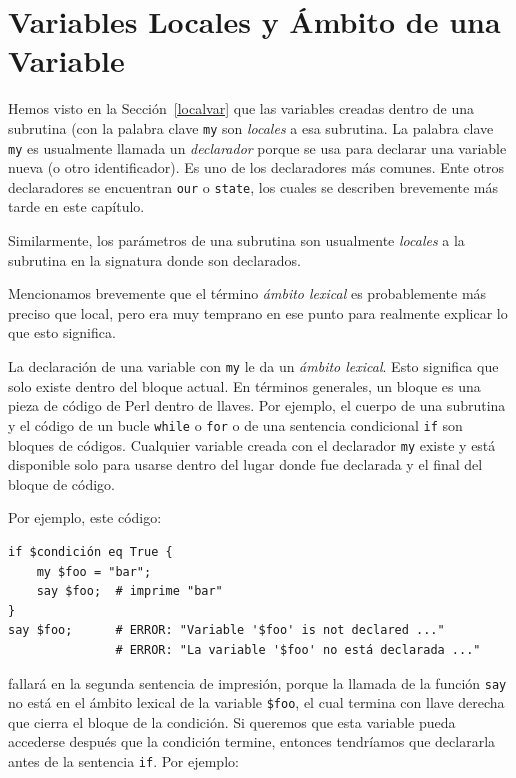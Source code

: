 \section{Variables Locales y Ámbito de una Variable}

Hemos visto en la Sección~\ref{localvar} que las variables
creadas dentro de una subrutina (con la palabra clave {\tt my}
son \emph{locales} a esa subrutina. La palabra clave {\tt my}
es usualmente llamada un \emph{declarador} porque 
se usa para declarar una variable nueva (o otro identificador).
Es uno de los declaradores más comunes. Ente otros declaradores
se encuentran {\tt our} o {\tt state}, los cuales se describen
brevemente más tarde en este capítulo.

Similarmente, los parámetros de una subrutina son usualmente
\emph{locales} a la subrutina en la signatura donde son
declarados.

Mencionamos brevemente que el término \emph{ámbito lexical}
es probablemente más preciso que local, pero era muy temprano
en ese punto para realmente explicar lo que esto significa.

La declaración de una variable con {\tt my} le da un \emph{ámbito lexical}.
Esto significa que solo existe dentro del bloque actual. En términos
generales, un bloque es una pieza de código de Perl dentro de llaves.
Por ejemplo, el cuerpo de una subrutina y el código de un bucle 
{\tt while} o {\tt for} o de una sentencia condicional {\tt if} 
son bloques de códigos. Cualquier variable creada con el declarador
{\tt my} existe y está disponible solo para usarse dentro del 
lugar donde fue declarada y el final del bloque de código.

Por ejemplo, este código:

\begin{lstlisting}
if $condición eq True {
    my $foo = "bar";
    say $foo;  # imprime "bar"
}
say $foo;      # ERROR: "Variable '$foo' is not declared ..."
			   # ERROR: "La variable '$foo' no está declarada ..."
\end{lstlisting}
%
fallará en la segunda sentencia de impresión, porque la llamada de la función
\verb|say| no está en el ámbito lexical de la variable {\tt \$foo}, 
el cual termina con llave derecha que cierra el bloque de la condición.
Si queremos que esta variable pueda accederse después que la condición termine,
entonces tendríamos que declararla antes de la sentencia {\tt if}.
Por ejemplo:

